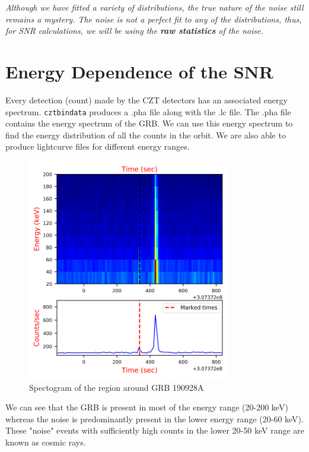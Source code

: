 \documentclass[11pt]{book} %
\begin{document}
\vfill

\textsl{Although we have fitted a variety of distributions, the true nature of the noise still remains a mystery. The noise is not a perfect fit to any of the distributions, thus, for SNR calculations, we will be using the \textbf{raw statistics} of the noise.}
\newpage 

\section{Energy Dependence of the SNR}

Every detection (count) made by the CZT detectors has an associated energy spectrum. \lstinline[language=Python]{cztbindata} produces a .pha file along with the .lc file. The .pha file contains the energy spectrum of the GRB. We can use this energy spectrum to find the energy distribution of all the counts in the orbit. We are also able to produce lightcurve files for different energy ranges.

\begin{figure}[H]
    \centering
    \includegraphics[width=0.8\textwidth]{Pictures/spectogram.png}
    \caption{Spectogram of the region around GRB 190928A}
\end{figure}

We can see that the GRB is present in most of the energy range (20-200 keV) whereas the noise is predominantly present in the lower energy range (20-60 keV). These "noise" events with sufficiently high counts in the lower 20-50 keV range are known as cosmic rays. 
\end{document}
